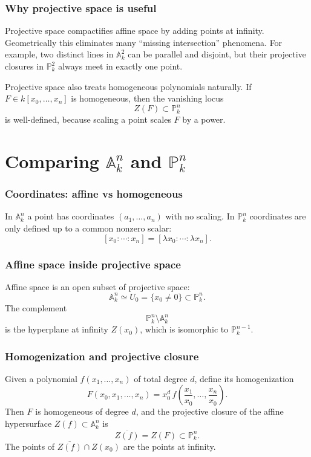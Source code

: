 \documentclass[12pt,a4paper]{article}
\theoremstyle{plain}
\theoremstyle{definition}      %
\begin{document}
\subsubsection*{Why projective space is useful}

Projective space compactifies affine space by adding points at infinity.
Geometrically this eliminates many ``missing intersection'' phenomena.
For example, two distinct lines in \(\mathbb A^2_k\) can be parallel and disjoint, but their projective closures in \(\mathbb P^2_k\) always meet in exactly one point.

Projective space also treats homogeneous polynomials naturally.
If \(F\in k[x_0,\dots,x_n]\) is homogeneous, then the vanishing locus
\[
Z(F)\subset \mathbb P^n_k
\]
is well-defined, because scaling a point scales \(F\) by a power.



\section*{Comparing \(\mathbb A^n_k\) and \(\mathbb P^n_k\)}

\subsubsection*{Coordinates: affine vs homogeneous}

In \(\mathbb A^n_k\) a point has coordinates \((a_1,\dots,a_n)\) with no scaling.
In \(\mathbb P^n_k\) coordinates are only defined up to a common nonzero scalar:
\[
[x_0:\cdots:x_n] = [\lambda x_0:\cdots:\lambda x_n].
\]

\subsubsection*{Affine space inside projective space}

Affine space is an open subset of projective space:
\[
\mathbb A^n_k \simeq U_0 = \{x_0\neq 0\}\subset \mathbb P^n_k.
\]
The complement
\[
\mathbb P^n_k\setminus \mathbb A^n_k
\]
is the hyperplane at infinity \(Z(x_0)\), which is isomorphic to \(\mathbb P^{n-1}_k\).

\subsubsection*{Homogenization and projective closure}

Given a polynomial \(f(x_1,\dots,x_n)\) of total degree \(d\), define its homogenization
\[
F(x_0,x_1,\dots,x_n)=x_0^d\,f\!\left(\frac{x_1}{x_0},\dots,\frac{x_n}{x_0}\right).
\]
Then \(F\) is homogeneous of degree \(d\), and the projective closure of the affine hypersurface \(Z(f)\subset \mathbb A^n_k\) is
\[
\overline{Z(f)} = Z(F)\subset \mathbb P^n_k.
\]
The points of \(\overline{Z(f)}\cap Z(x_0)\) are the points at infinity.
\end{document}
